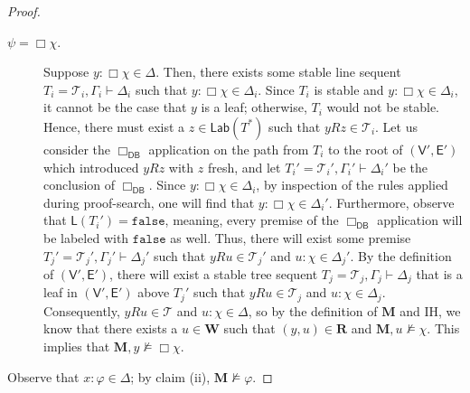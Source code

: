 \documentclass[10pt,a4paper]{amsart}
\newcommand{\M}{\mathbf{M}}
\newcommand{\R}{\mathbf{R}}
\newcommand{\W}{\mathbf{W}}
\newcommand{\cte}{\mathsf{E}}
\newcommand{\ctl}{\mathsf{L}}
\newcommand{\ctv}{\mathsf{V}}
\newcommand{\false}{\mathtt{false}}
\newcommand{\fval}{\false} %
\newcommand{\lab}{\mathsf{Lab}}
\newcommand{\ndrule}{\Box_\mathsf{DB}}
\renewcommand{\phi}{\varphi}
\newcommand{\sar}{\vdash}
\newcommand{\tel}{\mathcal{T}}
\newcommand{\tseq}{T} %
\begin{document}
\begin{proof}
\begin{description}
\item[$\psi = \Box \chi.$] Suppose $y : \Box \chi \in \Delta$. Then, there exists some stable line sequent $\tseq_{i} = \tel_{i}, \Gamma_{i} \sar \Delta_{i}$ such that $y : \Box \chi \in \Delta_{i}$. Since $\tseq_{i}$ is stable and $y : \Box \chi \in \Delta_{i}$, it cannot be the case that $y$ is a leaf; otherwise, $\tseq_{i}$ would not be stable. Hence, there must exist a $z \in \lab(\tseq^{*})$ such that $yRz \in \tel_{i}$. Let us consider the $\ndrule$ application on the path from $\tseq_{i}$ to the root of $(\ctv',\cte')$ which introduced $yRz$ with $z$ fresh, and let $\tseq_{i}' = \tel_{i}', \Gamma_{i}' \sar \Delta_{i}'$ be the conclusion of $\ndrule$. Since $y : \Box \chi \in \Delta_{i}$, by inspection of the rules applied during proof-search, one will find that $y : \Box \chi \in \Delta_{i}'$. Furthermore, observe that $\ctl(\tseq_{i}') = \fval$, meaning, every premise of the $\ndrule$ application will be labeled with $\fval$ as well. Thus, there will exist some premise $\tseq_{j}' = \tel_{j}', \Gamma_{j}' \sar \Delta_{j}'$ such that $yRu \in \tel_{j}'$ and $u : \chi \in \Delta_{j}'$. By the definition of $(\ctv',\cte')$, there will exist a stable tree sequent $\tseq_{j} = \tel_{j}, \Gamma_{j} \sar \Delta_{j}$ that is a leaf in $(\ctv',\cte')$ above $\tseq_{j}'$ such that $yRu \in \tel_{j}$ and $u : \chi \in \Delta_{j}$. Consequently, $yRu \in \tel$ and $u : \chi \in \Delta$, so by the definition of $\M$ and IH, we know that there exists a $u \in \W$ such that $(y,u) \in \R$ and $\M, u \not\models \chi$. This implies that $\M, y \not\models \Box \chi$.

\end{description}
Observe that $x : \phi \in \Delta$; by claim (ii), $\M \not\models \phi$.
\end{proof}
\end{document}
